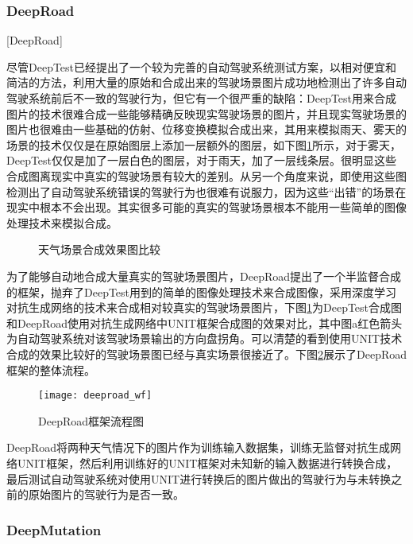\subsubsection{DeepRoad}[DeepRoad]

尽管DeepTest已经提出了一个较为完善的自动驾驶系统测试方案，以相对便宜和简洁的方法，利用大量的原始和合成出来的驾驶场景图片成功地检测出了许多自动驾驶系统前后不一致的驾驶行为，但它有一个很严重的缺陷：DeepTest用来合成图片的技术很难合成一些能够精确反映现实驾驶场景的图片，并且现实驾驶场景的图片也很难由一些基础的仿射、位移变换模拟合成出来，其用来模拟雨天、雾天的场景的技术仅仅是在原始图层上添加一层额外的图层，如下图\ref{label-deeptest}所示，对于雾天，DeepTest仅仅是加了一层白色的图层，对于雨天，加了一层线条层。很明显这些合成图离现实中真实的驾驶场景有较大的差别。从另一个角度来说，即使用这些图检测出了自动驾驶系统错误的驾驶行为也很难有说服力，因为这些“出错”的场景在现实中根本不会出现。其实很多可能的真实的驾驶场景根本不能用一些简单的图像处理技术来模拟合成。

\begin{figure}[h]
    \centering
    \caption{天气场景合成效果图比较}
    \label{label-deeptest}
\end{figure}

为了能够自动地合成大量真实的驾驶场景图片，DeepRoad提出了一个半监督合成的框架，抛弃了DeepTest用到的简单的图像处理技术来合成图像，采用深度学习对抗生成网络的技术来合成相对较真实的驾驶场景图片，下图\ref{label-deeptest}为DeepTest合成图和DeepRoad使用对抗生成网络中UNIT\cite{UNIT}框架合成图的效果对比，其中图a红色箭头为自动驾驶系统对该驾驶场景输出的方向盘拐角。可以清楚的看到使用UNIT技术合成的效果比较好的驾驶场景图已经与真实场景很接近了。下图\ref{deeproad_wf}展示了DeepRoad框架的整体流程。

\begin{figure}[h]
    \centering
    \texttt{[image: deeproad\_wf]}
    \caption{DeepRoad框架流程图\cite{DeepRoad}}
    \label{deeproad_wf}
\end{figure}

DeepRoad将两种天气情况下的图片作为训练输入数据集，训练无监督对抗生成网络UNIT\cite{UNIT}框架，然后利用训练好的UNIT框架对未知新的输入数据进行转换合成，最后测试自动驾驶系统对使用UNIT进行转换后的图片做出的驾驶行为与未转换之前的原始图片的驾驶行为是否一致。

\subsubsection{DeepMutation}

